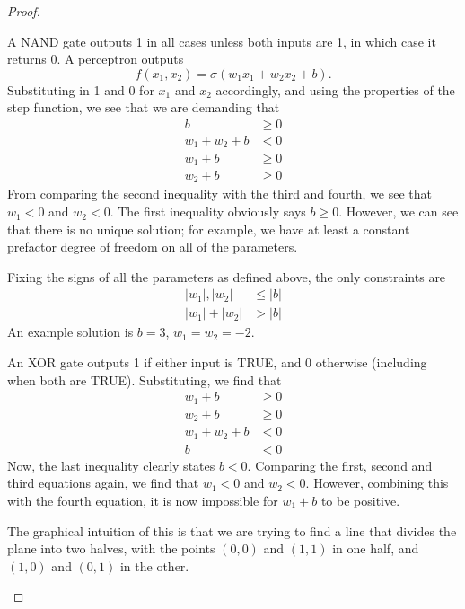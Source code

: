 \begin{proof}
	\begin{parts}
		\item A NAND gate outputs 1 in all cases unless both inputs are 1, in which case it returns 0. A perceptron outputs
		\[f(x_1,x_2) = \sigma(w_1 x_1+w_2x_2 + b).\]
		Substituting in 1 and 0 for $x_1$ and $x_2$ accordingly, and using the properties of the step function, we see that we are demanding that
		\begin{align*}
			b &\ge  0\\
			w_1+w_2 + b&< 0\\
			w_1 + b &\ge 0\\
			w_2 + b &\ge 0 
		\end{align*}
	From comparing the second inequality with the third and fourth, we see that $w_1<0$ and $w_2 < 0$. The first inequality obviously says $b\ge 0$. However, we can see that there is no unique solution; for example, we have at least a constant prefactor degree of freedom on all of the parameters.
	
	Fixing the signs of all the parameters as defined above, the only constraints are
	\begin{align*}
		|w_1|, |w_2|&\le |b|\\
		|w_1|+|w_2|&> |b|
	\end{align*}
An example solution is $b=3$, $w_1=w_2=-2$.
\item An XOR gate outputs 1 if either input is TRUE, and 0 otherwise (including when both are TRUE). Substituting, we find that
\begin{align*}
	w_1 + b &\ge 0\\
	w_2 + b &\ge 0\\
	w_1+w_2+b &<0\\
			b &< 0
\end{align*}
Now, the last inequality clearly states $b<0$. Comparing the first, second and third equations again, we find that $w_1<0$ and $w_2<0$. However, combining this with the fourth equation, it is now impossible for $w_1+b$ to be positive.

The graphical intuition of this is that we are trying to find a line that divides the plane into two halves, with the points $(0,0)$ and $(1,1)$ in one half, and $(1,0)$ and $(0,1)$ in the other. 


\end{parts}
\end{proof}

